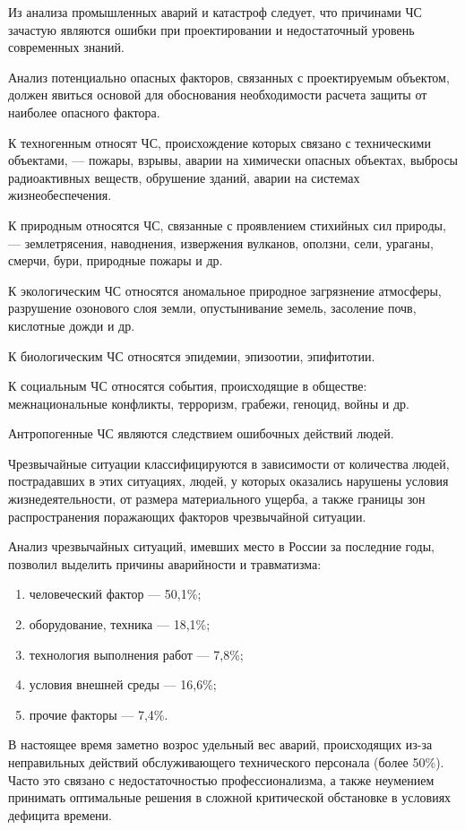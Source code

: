 Из анализа промышленных аварий и катастроф следует, что причинами ЧС зачастую являются ошибки при проектировании и недостаточный уровень современных знаний.

Анализ потенциально опасных факторов, связанных с проектируемым объектом, должен явиться основой для обоснования необходимости расчета защиты от наиболее опасного фактора.

К техногенным относят ЧС, происхождение которых связано с техническими объектами, — пожары, взрывы, аварии на химически опасных объектах, выбросы радиоактивных веществ, обрушение зданий, аварии на системах жизнеобеспечения.

К природным относятся ЧС, связанные с проявлением стихийных сил природы, — землетрясения, наводнения, извержения вулканов, оползни, сели, ураганы, смерчи, бури, природные пожары и др.

К экологическим ЧС относятся аномальное природное загрязнение атмосферы, разрушение озонового слоя земли, опустынивание земель, засоление почв, кислотные дожди и др.

К биологическим ЧС относятся эпидемии, эпизоотии, эпифитотии.

К социальным ЧС относятся события, происходящие в обществе: межнациональные конфликты, терроризм, грабежи, геноцид, войны и др.

Антропогенные ЧС являются следствием ошибочных действий людей.

Чрезвычайные ситуации классифицируются в зависимости от количества людей, пострадавших в этих ситуациях, людей, у которых оказались нарушены условия жизнедеятельности, от размера материального ущерба, а также границы зон распространения поражающих факторов чрезвычайной ситуации.

Анализ чрезвычайных ситуаций, имевших место в России за последние годы, позволил выделить причины аварийности и травматизма:

\begin{enumerate}
	\item человеческий фактор — 50,1\%;
	\item оборудование, техника — 18,1\%;
	\item технология выполнения работ — 7,8\%;
	\item условия внешней среды — 16,6\%;
	\item прочие факторы — 7,4\%.
\end{enumerate}

В настоящее время заметно возрос удельный вес аварий, происходящих из-за неправильных действий обслуживающего технического персонала (более 50\%). Часто это связано с недостаточностью профессионализма, а также неумением принимать оптимальные решения в сложной критической обстановке в условиях дефицита времени.

